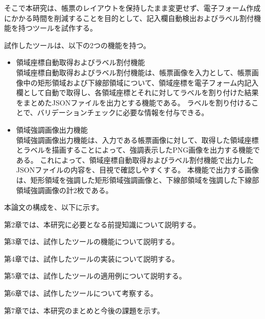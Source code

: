 そこで本研究は、帳票のレイアウトを保持したまま変更せず、電子フォーム作成にかかる時間を削減することを目的として、記入欄自動検出およびラベル割付機能を持つツールを試作する。


試作したツールは、以下の2つの機能を持つ。

\begin{itemize}
  \item 領域座標自動取得およびラベル割付機能\\
      領域座標自動取得およびラベル割付機能は、帳票画像を入力として、帳票画像中の矩形領域および下線部領域について、領域座標を電子フォーム内記入欄として自動で取得し、各領域座標とそれに対してラベルを割り付けた結果をまとめたJSONファイルを出力とする機能である。
      ラベルを割り付けることで、バリデーションチェックに必要な情報を付与できる。
  \item 領域強調画像出力機能\\
      領域強調画像出力機能は、入力である帳票画像に対して、取得した領域座標とラベルを描画することによって、強調表示したPNG画像を出力する機能である。
      これによって、領域座標自動取得およびラベル割付機能で出力したJSONファイルの内容を、目視で確認しやすくする。
      本機能で出力する画像は、矩形領域を強調した矩形領域強調画像と、下線部領域を強調した下線部領域強調画像の計2枚である。
\end{itemize}

本論文の構成を、以下に示す。\par
第2章では、本研究に必要となる前提知識について説明する。\par
第3章では、試作したツールの機能について説明する。\par
第4章では、試作したツールの実装について説明する。\par
第5章では、試作したツールの適用例について説明する。\par
第6章では、試作したツールについて考察する。\par
第7章では、本研究のまとめと今後の課題を示す。
